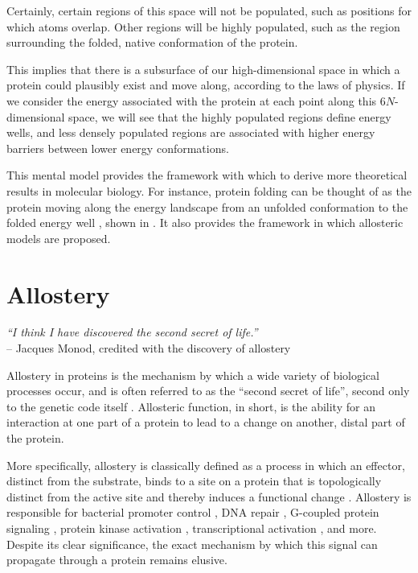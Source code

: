 Certainly, certain regions of this space will not be populated, such as positions for which atoms overlap. Other regions will be highly populated, such as the region surrounding the folded, native conformation of the protein.

This implies that there is a subsurface of our high-dimensional space in which a protein could plausibly exist and move along, according to the laws of physics. If we consider the energy associated with the protein at each point along this \(6N\)-dimensional space, we will see that the highly populated regions define energy wells, and less densely populated regions are associated with higher energy barriers between lower energy conformations.

This mental model provides the framework with which to derive more theoretical results in molecular biology. For instance, protein folding can be thought of as the protein moving along the energy landscape from an unfolded conformation to the folded energy well \parencite{onuchicTheoryProteinFolding1997}, shown in . It also provides the framework in which allosteric models are proposed.

\section{Allostery}

\begin{flushright}
	\textit{“I think I have discovered the second secret of life.”}\\
– Jacques Monod, credited with the discovery of allostery\\
\hfill\break
\end{flushright}

Allostery in proteins is the mechanism by which a wide variety of biological processes occur, and is often referred to as the ``second secret of life'', second only to the genetic code itself \parencite{monod1971chance}. Allosteric function, in short, is the ability for an interaction at one part of a protein to lead to a change on another, distal part of the protein.

More specifically, allostery is classically defined as a process in which an effector, distinct from the substrate, binds to a site on a protein that is topologically distinct from the active site and thereby induces a functional change \parencite{fenton2008allostery}. Allostery is responsible for bacterial promoter control \parencite{lewisAllosteryLacOperon2013, sharpAllosteryLacOperon2011}, DNA repair \parencite{lakhaniEvolutionaryCovarianceCombined2017, guptaMechanismMismatchRecognition2012}, G-coupled protein signaling \parencite{gentryNovelAllostericModulators2015, fengComputationalAdvancesDevelopment2015}, protein kinase activation \parencite{shiNetworksAllostericControl2006}, transcriptional activation \parencite{garcia-pinoAllosteryIntrinsicDisorder2010}, and more. Despite its clear significance, the exact mechanism by which this signal can propagate through a protein remains elusive.

